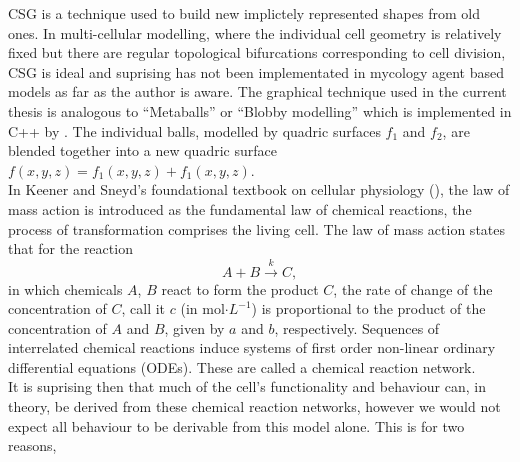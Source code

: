 CSG is a technique used to build new implictely represented shapes from old ones.
In multi-cellular modelling, where the individual cell geometry 
is relatively fixed but there 
are regular topological bifurcations corresponding to cell division,
CSG is ideal and suprising has not been implementated in mycology agent 
based models as far as the author is aware. The graphical technique used 
in the current thesis is analogous to ``Metaballs'' or ``Blobby modelling'' which is 
implemented in C++ by \cite{kommareddy20143d}. The individual balls, 
modelled by quadric surfaces $f_1$ and $f_2$, are blended together 
into a new quadric surface $f(x,y,z) = f_1(x,y,z) + f_1(x,y,z)$.
\\



In Keener and Sneyd's foundational textbook on cellular physiology 
(\cite{keener2009mathematical}), the law of mass action is 
introduced as the fundamental law of chemical reactions, 
the process of transformation comprises the living cell. The law of mass 
action states that for the reaction 
\begin{equation*}
    A + B \xrightarrow{k} C,
\end{equation*}
in which chemicals $A$, $B$ react to form the product $C$, the rate of change of the concentration of $C$, 
call it $c$ (in mol$\cdot L^{-1}$) is proportional to the product of the concentration 
of $A$ and $B$, given by $a$ and $b$, respectively. Sequences of interrelated chemical 
reactions induce systems of first order non-linear ordinary differential equations 
(ODEs). These are called a chemical reaction network.
\\

It is suprising then that much of the cell's functionality and behaviour 
can, in theory, be derived from these chemical reaction networks, however
we would not expect all behaviour to be derivable from this model alone.
This is for two reasons,

